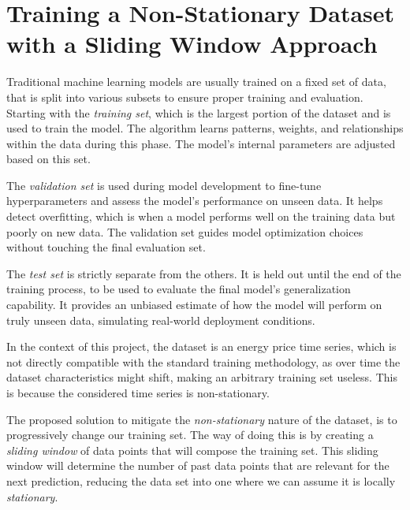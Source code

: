 \documentclass[12pt]{report} %
\begin{document}
\section{Training a Non-Stationary Dataset with a Sliding Window Approach}

Traditional machine learning models are usually trained on a fixed set of data, that is split into various subsets to ensure proper training and evaluation. Starting with the \textit{training set}, which is the largest portion of the dataset and is used to train the model. The algorithm learns patterns, weights, and relationships within the data during this phase. The model’s internal parameters are adjusted based on this set.

The \textit{validation set} is used during model development to fine-tune hyperparameters and assess the model’s performance on unseen data. It helps detect overfitting, which is when a model performs well on the training data but poorly on new data. The validation set guides model optimization choices without touching the final evaluation set.

The \textit{test set} is strictly separate from the others. It is held out until the end of the training process, to be used to evaluate the final model’s generalization capability. It provides an unbiased estimate of how the model will perform on truly unseen data, simulating real-world deployment conditions.

In the context of this project, the dataset is an energy price time series, which is not directly compatible with the standard training methodology, as over time the dataset characteristics might shift, making an arbitrary training set useless. This is because the considered time series is \textit{}{non-stationary}.

The proposed solution to mitigate the \textit{non-stationary} nature of the dataset, is to progressively change our training set. The way of doing this is by creating a \textit{sliding window} of data points that will compose the training set. This sliding window will determine the number of past data points that are relevant for the next prediction, reducing the data set into one where we can assume it is locally \textit{stationary}.
\end{document}
